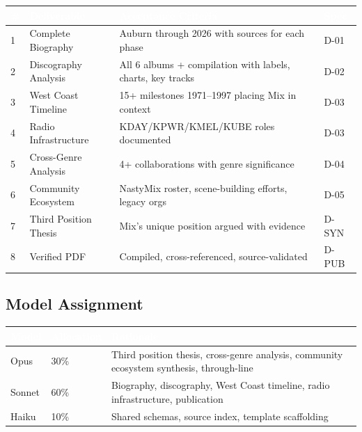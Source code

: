\documentclass[11pt,letterpaper]{article}
\newcommand{\tableheader}[1]{\textbf{\sffamily\textcolor{white}{#1}}}
\begin{document}
\begin{center}
\begin{tabularx}{\textwidth}{C{0.5cm}L{3cm}XL{2cm}}
\toprule
{}
\tableheader{\#} & \tableheader{Deliverable} & \tableheader{Acceptance Criteria} & \tableheader{Spec} \\
 & Complete Biography & Auburn through 2026 with sources for each phase & D-01 \\
2 & Discography Analysis & All 6 albums + compilation with labels, charts, key tracks & D-02 \\
3 & West Coast Timeline & 15+ milestones 1971--1997 placing Mix in context & D-03 \\
4 & Radio Infrastructure & KDAY/KPWR/KMEL/KUBE roles documented & D-03 \\
5 & Cross-Genre Analysis & 4+ collaborations with genre significance & D-04 \\
6 & Community Ecosystem & NastyMix roster, scene-building efforts, legacy orgs & D-05 \\
7 & Third Position Thesis & Mix's unique position argued with evidence & D-SYN \\
8 & Verified PDF & Compiled, cross-referenced, source-validated & D-PUB \\
\bottomrule
\end{tabularx}
\end{center}

\subsection{Model Assignment}

\begin{center}
\begin{tabularx}{\textwidth}{C{1.5cm}C{1.5cm}X}
\toprule
{}
\tableheader{Model} & \tableheader{Allocation} & \tableheader{Rationale} \\
\midrule
Opus & 30\% & Third position thesis, cross-genre analysis, community ecosystem synthesis, through-line \\
Sonnet & 60\% & Biography, discography, West Coast timeline, radio infrastructure, publication \\
Haiku & 10\% & Shared schemas, source index, template scaffolding \\
\bottomrule
\end{tabularx}
\end{center}
\end{document}
